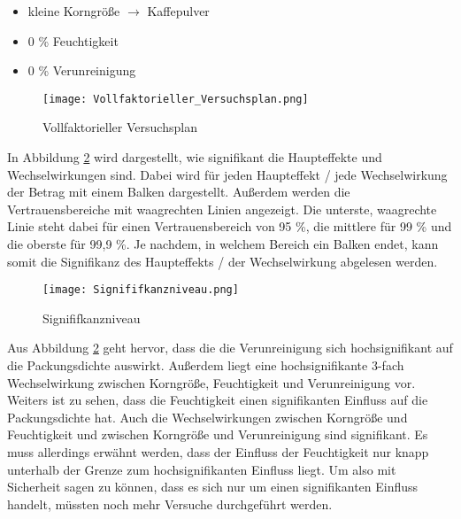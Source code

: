     \begin{itemize}
        \item kleine Korngröße $\rightarrow$ Kaffepulver
        \item 0 \% Feuchtigkeit
        \item 0 \% Verunreinigung 
    \end{itemize}

    \begin{figure}[H]
        \centering
        \texttt{[image: Vollfaktorieller\_Versuchsplan.png]}
        \caption{Vollfaktorieller Versuchsplan}
        \label{fig: Vollfaktorieller_Versuchsplan}
    \end{figure}

    \noindent
    In Abbildung \ref{fig: Signififkanzniveau} wird dargestellt, wie signifikant die Haupteffekte und
    Wechselwirkungen sind. Dabei wird für jeden Haupteffekt / jede Wechselwirkung der Betrag mit
    einem Balken dargestellt. Außerdem werden die Vertrauensbereiche mit waagrechten Linien
    angezeigt. Die unterste, waagrechte Linie steht dabei für einen Vertrauensbereich von 95 \%, die
    mittlere für 99 \% und die oberste für 99,9 \%. Je nachdem, in welchem Bereich ein Balken endet,
    kann somit die Signifikanz des Haupteffekts / der Wechselwirkung abgelesen werden.

    \begin{figure}[H]
        \centering
        \texttt{[image: Signififkanzniveau.png]}
        \caption{Signififkanzniveau}
        \label{fig: Signififkanzniveau}
    \end{figure}

    \noindent
    Aus Abbildung \ref{fig: Signififkanzniveau} geht hervor, dass die die Verunreinigung sich
    hochsignifikant auf die Packungsdichte auswirkt. Außerdem liegt eine hochsignifikante 3-fach
    Wechselwirkung zwischen Korngröße, Feuchtigkeit und Verunreinigung vor.
    \\

    \noindent
    Weiters ist zu sehen, dass die Feuchtigkeit einen signifikanten Einfluss auf die Packungsdichte
    hat. Auch die Wechselwirkungen zwischen Korngröße und Feuchtigkeit und zwischen Korngröße und
    Verunreinigung sind signifikant. Es muss allerdings erwähnt werden, dass der Einfluss der
    Feuchtigkeit nur knapp unterhalb der Grenze zum hochsignifikanten Einfluss liegt. Um also mit
    Sicherheit sagen zu können, dass es sich nur um einen signifikanten Einfluss handelt, müssten noch
    mehr Versuche durchgeführt werden.
    \\


